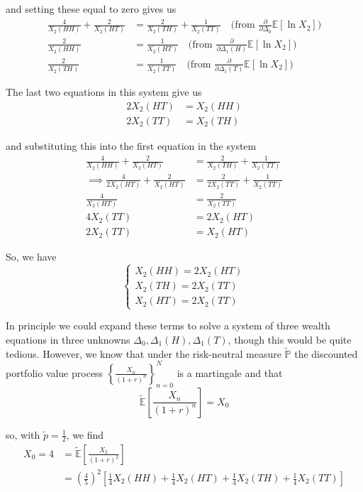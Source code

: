 \documentclass[12pt]{article}
\newlength\tindent
\renewcommand{\indent}{\hspace*{\tindent}}
\renewcommand{\P}{\mathbb P}
\newcommand{\E}{\mathbb E}
\begin{document}
and setting these equal to zero gives us
\begin{align*}
	\frac{4}{X_2(HH)} + \frac{2}{X_2(HT)} &= \frac{2}{X_2(TH)} + \frac{1}{X_2(TT)} \quad \text{(from } \frac{ \partial }{\partial\Delta_0} \E[\ln X_2]) \\
	\frac{2}{X_2(HH)} &= \frac{1}{X_2(HT)} \quad \text{(from } \frac{ \partial }{\partial\Delta_1(H)} \E[\ln X_2]) \\
	\frac{2}{X_2(TH)} &= \frac{1}{X_2(TT)} \quad \text{(from } \frac{ \partial }{\partial\Delta_1(T)} \E[\ln X_2]) 
\end{align*}

The last two equations in this system give us
\begin{align*}
	2X_2(HT) &= X_2(HH) \\
	2X_2(TT) &= X_2(TH)
\end{align*}

and substituting this into the first equation in the system
\begin{align*}
	\frac{4}{X_2(HH)} + \frac{2}{X_2(HT)} &= \frac{2}{X_2(TH)} + \frac{1}{X_2(TT)} \\
	\implies \frac{4}{2X_2(HT)} + \frac{2}{X_2(HT)} &= \frac{2}{2X_2(TT)} + \frac{1}{X_2(TT)} \\
	\frac{4}{X_2(HT)} &= \frac{2}{X_2(TT)} \\
	4X_2(TT) &= 2X_2(HT) \\
	2X_2(TT) &= X_2(HT)
\end{align*}

So, we have
\begin{equation*}
	\begin{cases}
		X_2(HH) = 2X_2(HT) \\
		X_2(TH) = 2X_2(TT) \\
		X_2(HT) = 2X_2(TT)
	\end{cases}
\end{equation*}

\indent In principle we could expand these terms to solve a system of three wealth equations in three unknowns $\Delta_0, \Delta_1(H), \Delta_1(T)$, though this would be quite tedious. However, we know that under the risk-neutral measure $\tilde{\P}$ the discounted portfolio value process $\left\{ \frac{X_n}{(1 + r)^n} \right\}^N_{n = 0}$ is a martingale and that
\begin{equation*}
	\tilde{\E} \left[ \frac{X_n}{(1 + r)^n} \right] = X_0
\end{equation*}

so, with $\tilde{p} = \frac{1}{2}$, we find
\begin{align*}
	X_0 = 4 &= \tilde{\E} \left[ \frac{X_2}{(1 + r)^2} \right] \\
	&= \left(\frac{4}{5}\right)^2 \left[ \frac{1}{4}X_2(HH) + \frac{1}{4}X_2(HT) + \frac{1}{4}X_2(TH) + \frac{1}{4}X_2(TT) \right]
\end{align*}
\end{document}

